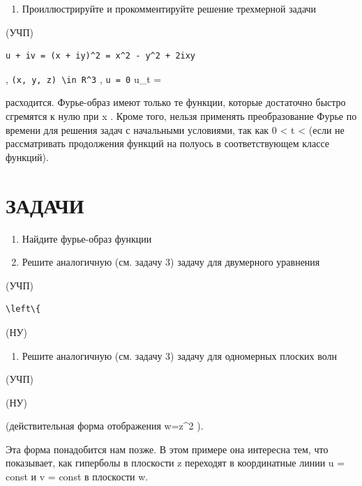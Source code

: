 \documentclass[
  ukrainian,
]{article}
\providecommand{\tightlist}{%
  \setlength{\itemsep}{0pt}\setlength{\parskip}{0pt}}
\begin{document}
\begin{enumerate}
\def\labelenumi{\arabic{enumi}.}
\setcounter{enumi}{2}
\tightlist
\item
  Проиллюстрируйте и прокомментируйте решение трехмерной задачи
\end{enumerate}

(УЧП)

\begin{verbatim}
u + iv = (x + iy)^2 = x^2 - y^2 + 2ixy
\end{verbatim}

, \texttt{(x,\ y,\ z)\ \textbackslash{}in\ R\^{}3} , \texttt{u\ =\ 0}
u\_t =

расходится. Фурье-образ имеют только те функции, которые достаточно
быстро сгремятся к нулю при \textbar x\textbar{} \to \infty . Кроме
того, нельзя применять преобразование Фурье по времени для решения задач
с начальными условиями, так как 0 \textless{} t \textless{}
\infty  (если не рассматривать продолжения функций на полуось в
соответствующем классе функций).

\section{ЗАДАЧИ}\label{ux437ux430ux434ux430ux447ux438-6}

\begin{enumerate}
\def\labelenumi{\arabic{enumi}.}
\item
  Найдите фурье-образ функции
\item
  Решите аналогичную (см. задачу 3) задачу для двумерного уравнения
\end{enumerate}

(УЧП)

\begin{verbatim}
\left\{
\end{verbatim}

(НУ)

\begin{enumerate}
\def\labelenumi{\arabic{enumi}.}
\setcounter{enumi}{4}
\tightlist
\item
  Решите аналогичную (см. задачу 3) задачу для одномерных плоских волн
\end{enumerate}

(УЧП)

(НУ)

(действительная форма отображения w=z\^{}2 ).

Эта форма понадобится нам позже. В этом примере она интересна тем, что
показывает, как гиперболы в плоскости z переходят в координатные линии u
= const и v = const в плоскости w.
\end{document}
